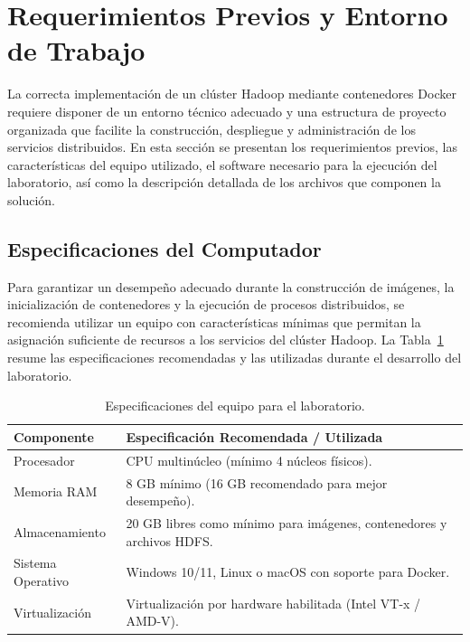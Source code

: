 \section{Requerimientos Previos y Entorno de Trabajo}

La correcta implementación de un clúster Hadoop mediante contenedores Docker requiere disponer de un entorno técnico adecuado y una estructura de proyecto organizada que facilite la construcción, despliegue y administración de los servicios distribuidos. En esta sección se presentan los requerimientos previos, las características del equipo utilizado, el software necesario para la ejecución del laboratorio, así como la descripción detallada de los archivos que componen la solución.

\subsection{Especificaciones del Computador}

Para garantizar un desempeño adecuado durante la construcción de imágenes, la inicialización de contenedores y la ejecución de procesos distribuidos, se recomienda utilizar un equipo con características mínimas que permitan la asignación suficiente de recursos a los servicios del clúster Hadoop. La Tabla~\ref{tab:especificaciones} resume las especificaciones recomendadas y las utilizadas durante el desarrollo del laboratorio.

\begin{table}[H]
\centering
\begin{tabular}{|l|p{9cm}|}
\hline
\textbf{Componente} & \textbf{Especificación Recomendada / Utilizada} \\ \hline
Procesador & CPU multinúcleo (mínimo 4 núcleos físicos). \\ \hline
Memoria RAM & 8 GB mínimo (16 GB recomendado para mejor desempeño). \\ \hline
Almacenamiento & 20 GB libres como mínimo para imágenes, contenedores y archivos HDFS. \\ \hline
Sistema Operativo & Windows 10/11, Linux o macOS con soporte para Docker. \\ \hline
Virtualización & Virtualización por hardware habilitada (Intel VT-x / AMD-V). \\ \hline
\end{tabular}
\caption{Especificaciones del equipo para el laboratorio.}
\label{tab:especificaciones}
\end{table}

